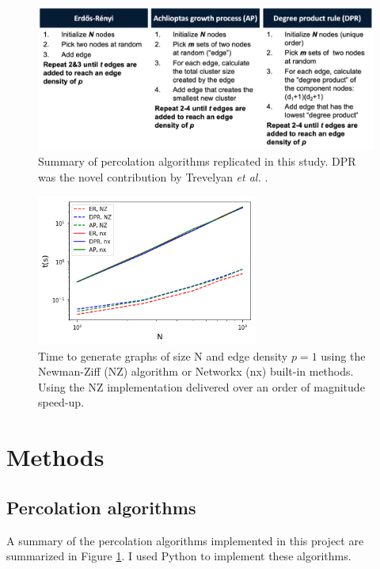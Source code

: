 \documentclass[11pt]{article}   	%
\begin{document}
\begin{figure}[t]
\begin{center}
\includegraphics[width=1.0\textwidth]{fig/algorithms.png}
\caption{Summary of percolation algorithms replicated in this study. DPR was the novel contribution by Trevelyan \textit{et al.} \cite{DPR_paper}.}
\label{fig:algorithms}
\end{center}
\end{figure}

\begin{figure}[t]
\begin{center}
\includegraphics[width=0.65\textwidth]{fig/time.png}
\caption{Time to generate graphs of size N and edge density $p=1$ using the Newman-Ziff (NZ) algorithm or Networkx (nx) built-in methods. Using the NZ implementation delivered over an order of magnitude speed-up.}
\label{fig:time}
\end{center}
\end{figure}

\section{Methods}
\subsection{Percolation algorithms}
A summary of the percolation algorithms implemented in this project are summarized in Figure \ref{fig:algorithms}. I used Python to implement these algorithms.
\end{document}
